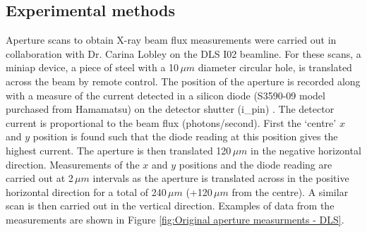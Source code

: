 \subsection{Experimental methods}
\label{sub:Experimental Methods - DLS}
Aperture scans to obtain X-ray beam flux measurements were carried out in collaboration with Dr. Carina Lobley on the DLS I02 beamline.
For these scans, a miniap device, a piece of steel with a 10$\,\mu m$ diameter circular hole, is translated across the beam by remote control.
The position of the aperture is recorded along with a measure of the current detected in a silicon diode (S3590-09 model purchased from Hamamatsu) on the detector shutter (i\_pin) \cite{owen2009}.
The detector current is proportional to the beam flux (photons/second).
First the `centre' $x$ and $y$ position is found such that the diode reading at this position gives the highest current.
The aperture is then translated 120$\,\mu m$ in the negative horizontal direction.
Measurements of the $x$ and $y$ positions and the diode reading are carried out at 2$\,\mu m$ intervals as the aperture is translated across in the positive horizontal direction for a total of 240$\,\mu m$ (+120$\,\mu m$ from the centre).
A similar scan is then carried out in the vertical direction.
Examples of data from the measurements are shown in Figure \ref{fig:Original aperture measurments - DLS}.
